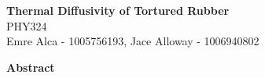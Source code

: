 \documentclass[11pt]{article}
\begin{document}
\begin{center}
    \Large {}  \textbf{Thermal Diffusivity of Tortured Rubber}\\
    \vspace{5pt} 
    \large PHY324\\
    \vspace{5pt}
    Emre Alca - 1005756193, Jace Alloway - 1006940802
\end{center}

\nd \hrulefill

\vspace{15pt}




 \selectfont \textbf{Abstract}

 \selectfont 

\lipsum[1]\\



\nd \hrulefill

\vspace{5pt}
\end{document}
